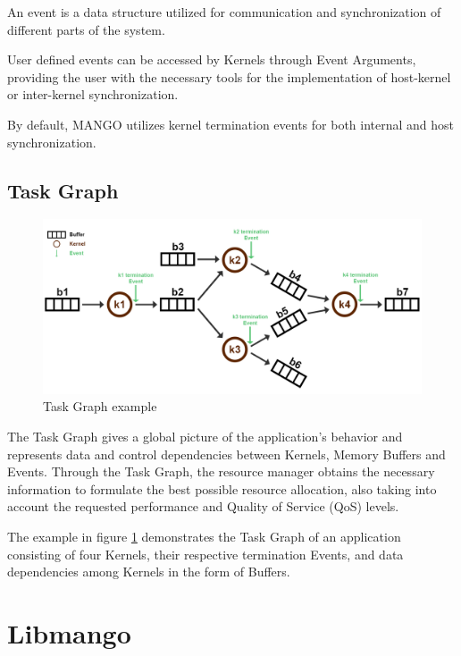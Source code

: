 An event is a data structure utilized for communication and synchronization of different parts of the system.

User defined events can be accessed by Kernels through Event Arguments, providing the user with the necessary tools for the implementation of host-kernel or inter-kernel synchronization.

By default, MANGO utilizes kernel termination events for both internal and host synchronization.

\subsection{Task Graph} \label{arch:TaskGraph}

\begin{figure}[ht]
    \centering
    \includegraphics[width=\textwidth]{img/taskgraph.png}
    \captionsetup{justification=centering}
    \caption{Task Graph example}
    \label{fig:TaskGraph}
\end{figure}

The Task Graph gives a global picture of the application's behavior and represents data and control dependencies between Kernels, Memory Buffers and Events. 
Through the Task Graph, the resource manager obtains the necessary information to formulate the best possible resource allocation, also taking into account the requested performance and Quality of Service (QoS) levels.

The example in figure \ref{fig:TaskGraph} demonstrates the Task Graph of an application consisting of four Kernels, their respective termination Events, and data dependencies among Kernels in the form of Buffers.

\section{Libmango}

